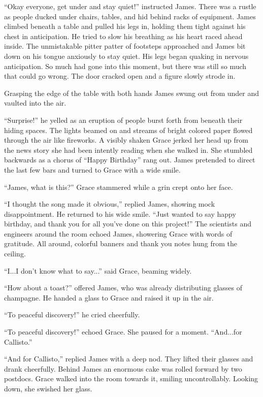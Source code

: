 \documentclass[openany, 12pt]{book} %
\begin{document}
``Okay everyone, get under and stay quiet!'' instructed James. There was a rustle as people ducked under chairs, tables, and hid behind racks of equipment. James climbed beneath a table and pulled his legs in, holding them tight against his chest in anticipation. He tried to slow his breathing as his heart raced ahead inside. The unmistakable pitter patter of footsteps approached and James bit down on his tongue anxiously to stay quiet. His legs began quaking in nervous anticipation. So much had gone into this moment, but there was still so much that could go wrong. The door cracked open and a figure slowly strode in.

Grasping the edge of the table with both hands James swung out from under and vaulted into the air.

``Surprise!'' he yelled as an eruption of people burst forth from beneath their hiding spaces. The lights beamed on and streams of bright colored paper flowed through the air like fireworks. A visibly shaken Grace jerked her head up from the news story she had been intently reading when she walked in. She stumbled backwards as a chorus of ``Happy Birthday'' rang out. James pretended to direct the last few bars and turned to Grace with a wide smile.

``James, what is this?'' Grace stammered while a grin crept onto her face.

``I thought the song made it obvious,'' replied James, showing mock disappointment. He returned to his wide smile. ``Just wanted to say happy birthday, and thank you for all you've done on this project!'' The scientists and engineers around the room echoed James, showering Grace with words of gratitude. All around, colorful banners and thank you notes hung from the ceiling.

``I...I don't know what to say...'' said Grace, beaming widely.

``How about a toast?'' offered James, who was already distributing glasses of champagne. He handed a glass to Grace and raised it up in the air.

``To peaceful discovery!'' he cried cheerfully.

``To peaceful discovery!'' echoed Grace. She paused for a moment. ``And...for Callisto.''

``And for Callisto,'' replied James with a deep nod. They lifted their glasses and drank cheerfully. Behind James an enormous cake was rolled forward by two postdocs. Grace walked into the room towards it, smiling uncontrollably. Looking down, she swished her glass.
\end{document}
